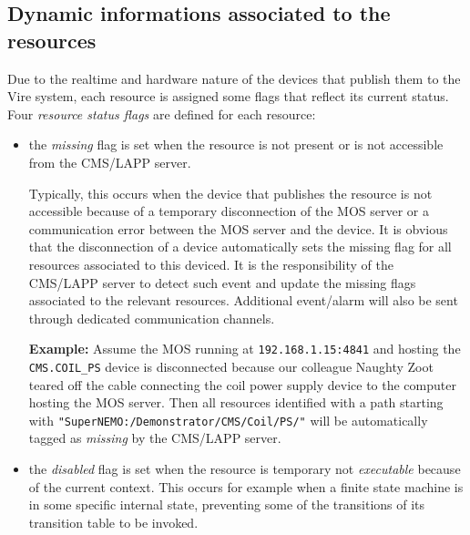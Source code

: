 
\subsection{Dynamic informations associated to the resources}
\label{sec:vire_resources:dynamic_infos}

Due to  the realtime and hardware  nature of the devices  that publish
them to  the Vire system,  each resource  is assigned some  flags that
reflect  its current  status.  Four \emph{resource  status flags}  are
defined for each resource:

\begin{itemize}

\item the \emph{missing} flag is set  when the resource is not present
  or is not accessible from the CMS/LAPP server.

  Typically, this occurs  when the device that  publishes the resource
  is not  accessible because of  a temporary disconnection of  the MOS
  server  or a  communication error  between  the MOS  server and  the
  device.   It  is   obvious  that  the  disconnection   of  a  device
  automatically sets the missing flag  for all resources associated to
  this deviced.  It is  the responsibility of  the CMS/LAPP  server to
  detect such  event and  update the missing  flags associated  to the
  relevant resources. Additional event/alarm will also be sent through
  dedicated communication channels.

\noindent\textbf{Example:}     Assume    the     MOS    running     at
\texttt{192.168.1.15:4841}   and  hosting   the  \texttt{CMS.COIL\_PS}
device is disconnected  because our colleague Naughty  Zoot teared off
the cable  connecting the coil  power supply device to  the computer
hosting the  MOS server.   Then all resources  identified with  a path
starting  with \verb|"SuperNEMO:/Demonstrator/CMS/Coil/PS/"|  will be
automatically tagged as \emph{missing} by the CMS/LAPP server.

\item the \emph{disabled}  flag is set when the  resource is temporary
  not \emph{executable}  because of the current  context.  This occurs
  for example when a finite state machine is in some specific internal
  state, preventing some of the transitions of its transition table to
  be invoked.


\end{itemize}
